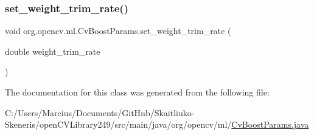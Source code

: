 \subsubsection{\texorpdfstring{set\+\_\+weight\+\_\+trim\+\_\+rate()}{set\_weight\_trim\_rate()}}
{\footnotesize\ttfamily void org.\+opencv.\+ml.\+Cv\+Boost\+Params.\+set\+\_\+weight\+\_\+trim\+\_\+rate (\begin{DoxyParamCaption}\item[{double}]{weight\+\_\+trim\+\_\+rate }\end{DoxyParamCaption})}



The documentation for this class was generated from the following file\+:\begin{DoxyCompactItemize}
\item 
C\+:/\+Users/\+Marcius/\+Documents/\+Git\+Hub/\+Skaitliuko-\/\+Skeneris/open\+C\+V\+Library249/src/main/java/org/opencv/ml/\mbox{\hyperlink{_cv_boost_params_8java}{Cv\+Boost\+Params.\+java}}\end{DoxyCompactItemize}
